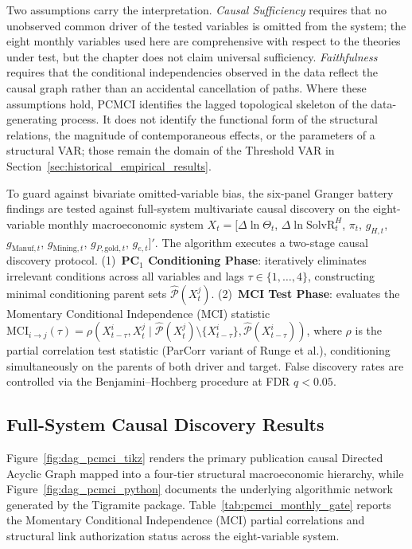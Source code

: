 Two assumptions carry the interpretation. \textit{Causal Sufficiency} requires that no unobserved common driver of the tested variables is omitted from the system; the eight monthly variables used here are comprehensive with respect to the theories under test, but the chapter does not claim universal sufficiency. \textit{Faithfulness} requires that the conditional independencies observed in the data reflect the causal graph rather than an accidental cancellation of paths. Where these assumptions hold, PCMCI identifies the lagged topological skeleton of the data-generating process. It does not identify the functional form of the structural relations, the magnitude of contemporaneous effects, or the parameters of a structural VAR; those remain the domain of the Threshold VAR in Section~\ref{sec:historical_empirical_results}.

To guard against bivariate omitted-variable bias, the six-panel Granger battery findings are tested against full-system multivariate causal discovery on the eight-variable monthly macroeconomic system
$X_t = [ \Delta \ln \Theta_t$, $\Delta \ln \text{SolvR}_t^H$, $\pi_t$, $g_{H,t}$, $g_{\text{Manuf},t}$, $g_{\text{Mining},t}$, $g_{P,\text{gold},t}$, $g_{e,t} ]'$.
The algorithm executes a two-stage causal discovery protocol. (1)~\textbf{PC$_1$ Conditioning Phase}: iteratively eliminates irrelevant conditions across all variables and lags $\tau \in \{1, \dots, 4\}$, constructing minimal conditioning parent sets $\widehat{\mathcal{P}}(X^j_t)$. (2)~\textbf{MCI Test Phase}: evaluates the Momentary Conditional Independence (MCI) statistic $\text{MCI}_{i \to j}(\tau) = \rho(X^i_{t-\tau}, X^j_t \mid \widehat{\mathcal{P}}(X^j_t) \setminus \{X^i_{t-\tau}\}, \widehat{\mathcal{P}}(X^i_{t-\tau}))$, where $\rho$ is the partial correlation test statistic (ParCorr variant of Runge et al.), conditioning simultaneously on the parents of both driver and target. False discovery rates are controlled via the Benjamini--Hochberg procedure at FDR $q < 0.05$.

\subsection{Full-System Causal Discovery Results}
Figure~\ref{fig:dag_pcmci_tikz} renders the primary publication causal Directed Acyclic Graph mapped into a four-tier structural macroeconomic hierarchy, while Figure~\ref{fig:dag_pcmci_python} documents the underlying algorithmic network generated by the Tigramite package. Table~\ref{tab:pcmci_monthly_gate} reports the Momentary Conditional Independence (MCI) partial correlations and structural link authorization status across the eight-variable system.


